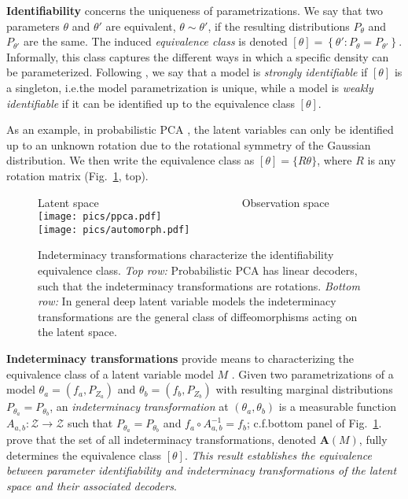 \textbf{Identifiability} concerns the uniqueness of parametrizations. We say that two parameters $\theta$ and $\theta'$ are equivalent, $\theta \sim \theta'$, if the resulting distributions $P_{\theta}$ and $P_{\theta'}$ are the same. The induced \emph{equivalence class} is denoted $[\theta]=\left\{ \theta': P_{\theta} = P_{\theta'} \right\}$. Informally, this class captures the different ways in which a specific density can be parameterized. Following \citet{xi2023indeterminacy}, we say that a model is \emph{strongly identifiable} if $[\theta]$ is a singleton, i.e.\@ the model parametrization is unique, while a model is \emph{weakly identifiable} if it can be identified up to the equivalence class $[\theta]$. 

As an example, in probabilistic PCA \citep{tipping1999probabilistic}, the latent variables can only be identified up to an unknown rotation due to the rotational symmetry of the Gaussian distribution. We then write the equivalence class as $[\theta] = \{R\theta\}$, where $R$ is any rotation matrix (Fig.~\ref{fig:automorph}, top).

\begin{figure}
    \centering
    \footnotesize{Latent space~~~~~~~~~~~~~~~~~~~~~~~~~~Observation space}\\
    \texttt{[image: pics/ppca.pdf]} \\ \vspace{1mm}
    \texttt{[image: pics/automorph.pdf]}
    \vspace{-2mm}
    \caption{Indeterminacy transformations characterize the identifiability equivalence class.
      \emph{Top row:} Probabilistic PCA has linear decoders, such that the indeterminacy transformations are rotations.
      \emph{Bottom row:} In general deep latent variable models the indeterminacy transformations are the general class of diffeomorphisms acting on the latent space.}
    \label{fig:automorph}
\end{figure}

\textbf{Indeterminacy transformations} provide means to characterizing the equivalence class of a latent variable model $M$ \citep{xi2023indeterminacy}. Given two parametrizations of a model $\theta_a=\left(f_a, P_{Z_a}\right)$ and $\theta_b=\left(f_b, P_{Z_b}\right)$ with resulting marginal distributions $P_{\theta_a}=P_{\theta_b}$, an \emph{indeterminacy transformation} at $(\theta_a, \theta_b)$ is a measurable function $A_{a,b}: \mathcal{Z} \rightarrow \mathcal{Z}$ such that $P_{\theta_a}=P_{\theta_b}$ and $f_a \circ A_{a,b}^{-1}=f_b$; c.f.\@ bottom panel of Fig.~\ref{fig:automorph}. \citet{xi2023indeterminacy} prove that the set of all indeterminacy transformations, denoted $\mathbf{A}(M)$, fully determines the equivalence class $[\theta]$.  \emph{This result establishes the equivalence between parameter identifiability and indeterminacy transformations of the latent space and their associated decoders}.

